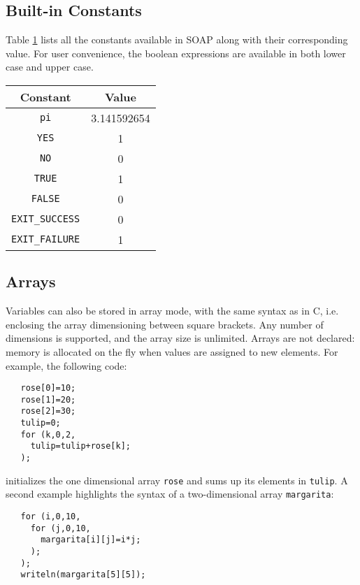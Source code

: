 \documentclass{warpdoc}
\newcommand{\tablespacing}{\vspace{-0.4cm}}
\renewcommand{\fontsizetable}{\footnotesize\scalefont{1.0}}
\begin{document}
\subsection{Built-in Constants}

Table \ref{table:constants} lists all the constants available in SOAP
along with their corresponding value.
For user convenience, the boolean expressions are available in
both lower case and upper case.

\begin{table}[ht]
\fontsizetable
\vspace{0.3cm}
\begin{center}
  \begin{threeparttable}
    \begin{tabular}{cc}
      \toprule
        Constant & Value \\
       \midrule
        \verb|pi| & 3.141592654\\
        \verb|YES| & 1\\
        \verb|NO| & 0\\
        \verb|TRUE| & 1\\
        \verb|FALSE| & 0\\
        \verb|EXIT_SUCCESS| &0\\
        \verb|EXIT_FAILURE| &1   \\
      \bottomrule
    \end{tabular}
    \label{table:constants}
  \end{threeparttable}
\end{center}
\tablespacing
\end{table}
%




\subsection{Arrays}

Variables can also be stored in array mode, with the same syntax as in C,
i.e. enclosing the array dimensioning between square brackets. Any number of
dimensions is supported, and the array size is unlimited. Arrays
are not declared: memory is allocated on the fly when values are assigned
to new elements. For example, the following code:
%
\begin{verbatim}
   rose[0]=10;
   rose[1]=20;
   rose[2]=30;
   tulip=0;
   for (k,0,2,
     tulip=tulip+rose[k];
   );
\end{verbatim}
%
initializes the one dimensional array \verb|rose| and sums up its elements
in \verb|tulip|. A second example highlights the syntax of a two-dimensional
array \verb|margarita|:
%
\begin{verbatim}
   for (i,0,10,
     for (j,0,10,
       margarita[i][j]=i*j;
     );
   );
   writeln(margarita[5][5]);
\end{verbatim}
%
\end{document}
